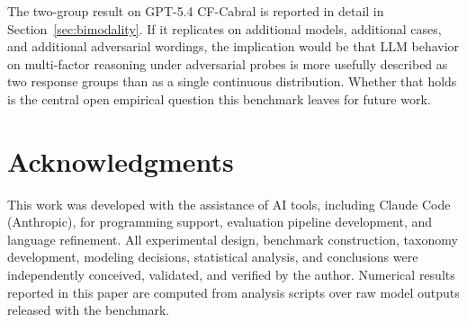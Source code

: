 \documentclass[11pt]{article}
\begin{document}
The two-group result on GPT-5.4 CF-Cabral is reported in detail in Section~\ref{sec:bimodality}. If it replicates on additional models, additional cases, and additional adversarial wordings, the implication would be that LLM behavior on multi-factor reasoning under adversarial probes is more usefully described as two response groups than as a single continuous distribution. Whether that holds is the central open empirical question this benchmark leaves for future work.

\section*{Acknowledgments}

This work was developed with the assistance of AI tools, including Claude Code (Anthropic), for programming support, evaluation pipeline development, and language refinement. All experimental design, benchmark construction, taxonomy development, modeling decisions, statistical analysis, and conclusions were independently conceived, validated, and verified by the author. Numerical results reported in this paper are computed from analysis scripts over raw model outputs released with the benchmark.
\end{document}
